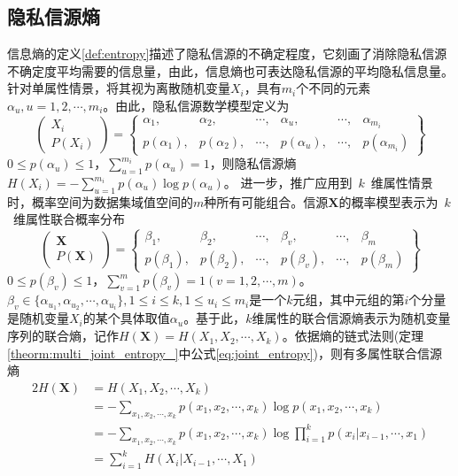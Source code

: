 \subsection{隐私信源熵}
信息熵的定义\ref{def:entropy}描述了隐私信源的不确定程度，它刻画了消除隐私信源不确定度平均需要的信息量，由此，信息熵也可表达隐私信源的平均隐私信息量。针对单属性情景，将其视为离散随机变量$X_i$，具有$m_i$个不同的元素$\alpha_u,u=1,2,\cdots,m_i$。由此，隐私信源数学模型定义为
\begin{equation}
\begin{pmatrix}
X_i\\
P(X_i)
\end{pmatrix}=\begin{Bmatrix}
\alpha_{1}, & \alpha_{2}, & \cdots, & \alpha_{u}, & \cdots,  & \alpha_{m_i}\\
p(\alpha_{1}),& p(\alpha_{2}), & \cdots, & p(\alpha_{u}), & \cdots, & p(\alpha_{m_i})
\end{Bmatrix}
\end{equation}
$0 \leq p(\alpha_u) \leq 1$，$\sum_{u=1}^{m_i}p(\alpha_u)=1$，则隐私信源熵$H(X_i)=-\sum_{u=1}^{m_i}p(\alpha_u) \log p(\alpha_u)$。
进一步，推广应用到~$k$~维属性情景时，概率空间为数据集域值空间的$m$种所有可能组合。信源$\bm{X}$的概率模型表示为~$k$~维属性联合概率分布
\begin{equation}
	\begin{pmatrix}
		\bm{X}\\
		P(\bm{X})
	\end{pmatrix}=\begin{Bmatrix}
		\beta_{1}, & \beta_{2}, & \cdots,  & \beta_{v}, & \cdots,  & \beta_{m}\\
		p(\beta_{1}),& p(\beta_{2}), & \cdots, & p(\beta_{v}), & \cdots, & p(\beta_{m})
	\end{Bmatrix}
\end{equation}
$0 \leq p(\beta_v) \leq 1$，$\sum_{v=1}^{m}p(\beta_v)=1 (v=1,2,\cdots,m)$。$\beta_v \in \{\alpha_{u_1},\alpha_{u_2},\cdots,\alpha_{u_i}\},1\leq i \leq k, 1\leq u_i \leq m_i$是一个$k$元组，其中元组的第$i$个分量是随机变量$X_i$的某个具体取值$\alpha_u$。基于此，$k$维属性的联合信源熵表示为随机变量序列的联合熵，记作$H(\bm{X}) = H(X_1,X_2,\cdots,X_k)$。依据熵的链式法则(定理\ref{theorm:multi_joint_entropy_}中公式\ref{eq:joint_entropy})，则有多属性联合信源熵
\begin{alignat}{2}
	H(\bm{X}) & = H(X_1,X_2,\cdots,X_k) \\
	& = -\sum_{x_1,x_2,\cdots, x_k} p(x_1,x_2,\cdots, x_k)\log p(x_1,x_2,\cdots, x_k)\\
	& = -\sum_{x_1,x_2,\cdots, x_k} p(x_1,x_2,\cdots, x_k)\log \prod_{i=1}^{k}p(x_i|x_{i-1},\cdots,x_1)\\
	& = \sum_{i=1}^{k}H(X_i|X_{i-1},\cdots,X_1)\label{eq:chapter03-7}
\end{alignat}



